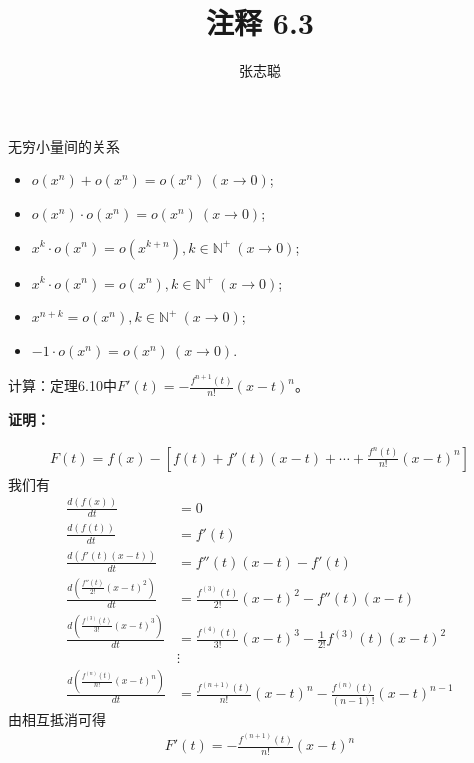 \documentclass{article}
\begin{document}
\title{注释 6.3}
\author{张志聪}
\maketitle

\begin{zremark}
  无穷小量间的关系
\end{zremark}

\begin{itemize}
  \item $o(x^n) + o(x^n) = o(x^n) \ (x \to 0)$;
  \item $o(x^n) \cdot o(x^n) = o(x^n) \ (x \to 0)$;
  \item $x^k \cdot o(x^n) = o(x^{k + n}), k \in \mathbb{N^+} \ (x \to 0)$;
  \item $x^k \cdot o(x^n) = o(x^{n}), k \in \mathbb{N^+} \ (x \to 0)$;
  \item $x^{n + k} = o(x^n), k \in \mathbb{N^+} \ (x \to 0)$;
  \item $-1 \cdot o(x^n) = o(x^n) \ (x \to 0)$.
\end{itemize}

\begin{zremark}
  计算：定理6.10中$F'(t) = - \frac{f^{n + 1}(t)}{n!}(x - t)^n$。
\end{zremark}

\textbf{证明：}

\begin{align*}
  F(t) = f(x) - \left[f(t) + f'(t)(x - t) + \cdots + \frac{f^{n}(t)}{n!}(x - t)^n\right]
\end{align*}
我们有
\begin{align*}
  \frac{d(f(x))}{dt}                           & = 0                                                                         \\
  \frac{d(f(t))}{dt}                           & = f'(t)                                                                     \\
  \frac{d(f'(t)(x - t))}{dt}                   & = f''(t)(x - t) - f'(t)                                                     \\
  \frac{d(\frac{f''(t)}{2!}(x - t)^2)}{dt}     & = \frac{f^{(3)}(t)}{2!}(x - t)^2 - f''(t)(x - t)                            \\
  \frac{d(\frac{f^{(3)}(t)}{3!}(x - t)^3)}{dt} & = \frac{f^{(4)}(t)}{3!}(x - t)^3 - \frac{1}{2!}f^{(3)}(t)(x - t)^2          \\
                                               & \vdots                                                                      \\
  \frac{d(\frac{f^{(n)}(t)}{n!}(x - t)^n)}{dt} & = \frac{f^{(n+1)}(t)}{n!}(x - t)^n - \frac{f^{(n)}(t)}{(n-1)!}(x - t)^{n-1}
\end{align*}
由相互抵消可得
\begin{align*}
  F'(t) = - \frac{f^{(n+1)}(t)}{n!}(x - t)^n
\end{align*}
\end{document}
